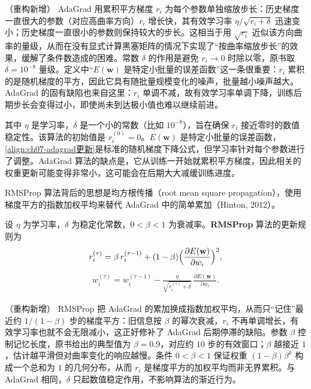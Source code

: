 \documentclass[../../main.tex]{subfiles}
\begin{document}
\begin{remark}（重构新增）
AdaGrad 用累积平方梯度 $r_i$ 为每个参数单独缩放步长：历史梯度一直很大的参数（对应高曲率方向）$r_i$ 增长快，其有效学习率 $\eta/\sqrt{r_i+\delta}$ 迅速变小；历史梯度一直很小的参数则保持较大的步长。这相当于用 $\sqrt{r_i}$ 近似该方向曲率的量级，从而在没有显式计算黑塞矩阵的情况下实现了“按曲率缩放步长”的效果，缓解了条件数造成的困难。常数 $\delta$ 的作用是避免 $r_i\to0$ 时除以零，原书取 $\delta=10^{-8}$ 量级。定义中“$E(\mathbf{w})$ 是特定小批量的误差函数”这一条很重要：$r_i$ 累积的是随机梯度的平方，因此它具有随批量规模变化的噪声，批量越小噪声越大。AdaGrad 的固有缺陷也来自这里：$r_i$ 单调不减，故有效学习率单调下降，训练后期步长会变得过小，即使尚未到达极小值也难以继续前进。
\end{remark}

其中 $\eta$ 是学习率，$\delta$ 是一个小的常数（比如 $10^{-8}$），旨在确保 $r_i$ 接近零时的数值稳定性。该算法的初始值是 $r_i^{(0)}=0$。$E(\mathbf{w})$ 是特定小批量的误差函数，\eqref{align:ch07-adagrad更新}是标准的随机梯度下降公式，但学习率针对每个参数进行了调整。AdaGrad 算法的缺点是，它从训练一开始就累积平方梯度，因此相关的权重更新可能变得非常小，这可能会在后期大大减缓训练进度。

RMSProp 算法背后的思想是均方根传播（root mean square propagation），使用梯度平方的指数加权平均来替代 AdaGrad 中的简单累加（Hinton, 2012）。

\begin{definition}[RMSProp]\label{definition:ch07-RMSProp}
设 $\eta$ 为学习率，$\delta$ 为稳定化常数，$0<\beta<1$ 为衰减率。\textbf{RMSProp} 算法的更新规则为
\begin{align}
r_i^{(\tau)} = \beta\,r_i^{(\tau-1)}+(1-\beta)\Bigl(\frac{\partial E(\mathbf{w})}{\partial w_i}\Bigr)^{2},
\label{align:ch07-rmsprop}
\end{align}
\begin{align}
w_i^{(\tau)} = w_i^{(\tau-1)}-\frac{\eta}{\sqrt{r_i^{(\tau)}+\delta}}\,\frac{\partial E(\mathbf{w})}{\partial w_i}.
\label{align:ch07-rmsprop更新}
\end{align}
\end{definition}

\begin{remark}（重构新增）
RMSProp 把 AdaGrad 的累加换成指数加权平均，从而只“记住”最近约 $1/(1-\beta)$ 步的梯度平方：旧信息按 $\beta$ 的幂次衰减，$r_i$ 不再单调增长，有效学习率也就不会无限减小，这正好修补了 AdaGrad 后期停滞的缺陷。参数 $\beta$ 控制记忆长度，原书给出的典型值为 $\beta=0.9$，对应约 $10$ 步的有效窗口；$\beta$ 越接近 $1$，估计越平滑但对曲率变化的响应越慢。条件 $0<\beta<1$ 保证权重 $(1-\beta)\beta^{k}$ 构成一个总和为 $1$ 的几何分布，从而 $r_i$ 是梯度平方的加权平均而非无界累积。与 AdaGrad 相同，$\delta$ 只起数值稳定作用，不影响算法的渐近行为。
\end{remark}
\end{document}
